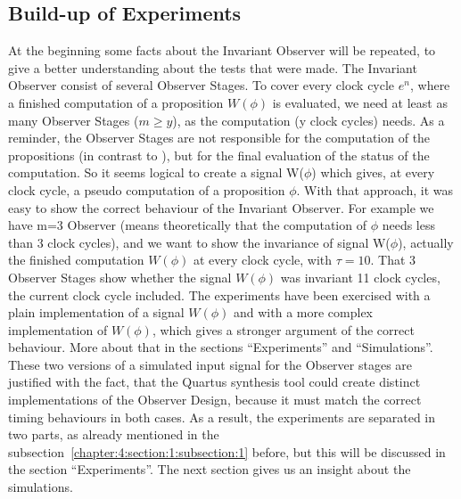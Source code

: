 \subsection{Build-up of Experiments}
\label{chapter:4:section:1:subsection:2}
At the beginning some facts about the Invariant Observer will be repeated, to give a better understanding about the tests that were made.
The Invariant Observer consist of several Observer Stages. 
To cover every clock cycle $e^n$, where a finished computation of a proposition $W(\phi)$ is evaluated, we need at least as many Observer Stages ($m \ge y$), as
the computation (y clock cycles) needs. 
As a reminder, the Observer Stages are not responsible for the computation of the propositions (in contrast to \cite{RTFMBJ13}),
but for the final evaluation of the status of the computation.
So it seems logical to create a signal W($\phi$) which gives, at every clock cycle, a pseudo computation of a proposition $\phi$. 
With that approach, it was easy to show the correct behaviour of the Invariant Observer. 
For example we have m=3 Observer (means theoretically that the computation of $\phi$ needs less than 3 clock cycles), 
and we want to show the invariance of signal W($\phi$), actually the finished computation $W(\phi)$ at every clock cycle, with $\tau = 10$. 
That 3 Observer Stages show whether the signal $W(\phi)$ was invariant 11 clock cycles, the current clock cycle included.
The experiments have been exercised with a plain implementation of a signal $W(\phi)$ and with a more complex implementation of $W(\phi)$, which gives a stronger argument of the correct behaviour.
More about that in the sections ``Experiments'' and ``Simulations''.
These two versions of a simulated input signal for the Observer stages are justified with the fact, 
that the Quartus synthesis tool could create distinct implementations of the Observer Design, because it must match the correct timing behaviours in both cases.   
As a result, the experiments are separated in two parts, as already mentioned in the subsection~\ref{chapter:4:section:1:subsection:1} before, 
but this will be discussed in the section ``Experiments''.   
The next section gives us an insight about the simulations.
%

